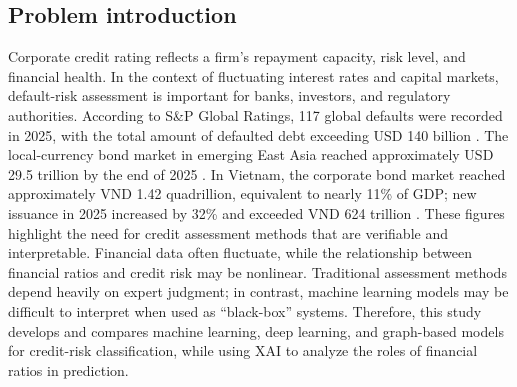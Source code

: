 \documentclass[10pt,twoside]{article}
\begin{document}
\subsection{Problem introduction}
Corporate credit rating reflects a firm's repayment capacity, risk level, and financial health. In the context of fluctuating interest rates and capital markets, default-risk assessment is important for banks, investors, and regulatory authorities. According to S\&P Global Ratings, 117 global defaults were recorded in 2025, with the total amount of defaulted debt exceeding USD 140 billion \cite{noauthor_default_nodate}. The local-currency bond market in emerging East Asia reached approximately USD 29.5 trillion by the end of 2025 \cite{bank_asia_2025}. In Vietnam, the corporate bond market reached approximately VND 1.42 quadrillion, equivalent to nearly 11\% of GDP; new issuance in 2025 increased by 32\% and exceeded VND 624 trillion \cite{noauthor_tong_nodate}. These figures highlight the need for credit assessment methods that are verifiable and interpretable. Financial data often fluctuate, while the relationship between financial ratios and credit risk may be nonlinear. Traditional assessment methods depend heavily on expert judgment; in contrast, machine learning models may be difficult to interpret when used as ``black-box'' systems. Therefore, this study develops and compares machine learning, deep learning, and graph-based models for credit-risk classification, while using XAI to analyze the roles of financial ratios in prediction.
\end{document}
